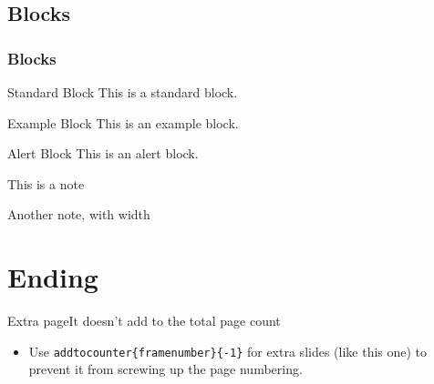 \documentclass[11 pt,t,aspectratio=169]{beamer}
\begin{document}
\subsection{Blocks}
\begin{frame}
    \frametitle{Blocks}

    \begin{block}{Standard Block}
        This is a standard block.
    \end{block}

    \begin{exampleblock}{Example Block}
        This is an example block.
    \end{exampleblock}

    \begin{alertblock}{Alert Block}
        This is an alert block.
    \end{alertblock}

    \begin{noteblock}
        This is a note
    \end{noteblock}

    \begin{noteblock}[wd=5cm]
        Another note, with width
    \end{noteblock}

\end{frame}

\section{Ending}


\final

\addtocounter{framenumber}{-1}
\begin{frame}[c]{Extra page}{It doesn't add to the total page count}
    \begin{itemize}
        \item Use \alert{\texttt{addtocounter\{framenumber\}\{-1\}}} for extra slides (like this one) to prevent it from screwing up the page numbering.
    \end{itemize}
\end{frame}
\end{document}
